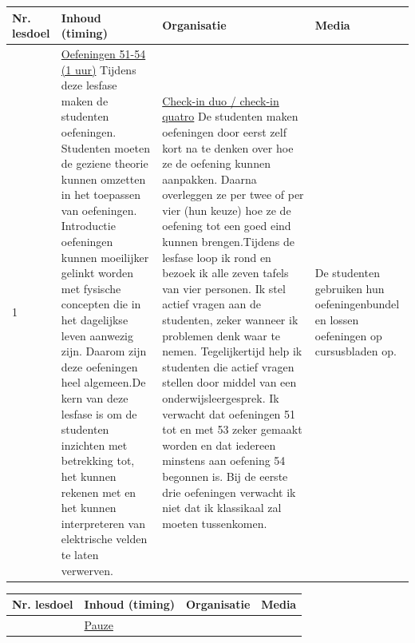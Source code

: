 \begin{landscape}
\begin{tabularx}{1.56\textwidth}{|p{1.5cm}|p{6cm}|X|p{4cm}|}
	\hline
	\textbf{Nr. lesdoel } & \textbf{Inhoud (timing)}  & \textbf{Organisatie } & \textbf{Media } \\ \hline
	1\newline 2\newline 3\newline 4\newline 5\newline 6\newline 9	&\underline{Oefeningen 51-54 (1 uur)}\newline
	Tijdens deze lesfase maken de studenten oefeningen. Studenten moeten de geziene theorie kunnen omzetten in het toepassen van oefeningen. Introductie oefeningen kunnen moeilijker gelinkt worden met fysische concepten die in het dagelijkse leven aanwezig zijn.  Daarom zijn deze oefeningen heel algemeen.\newline De kern van deze lesfase is om de studenten  inzichten met betrekking tot, het kunnen rekenen met en het kunnen interpreteren van  elektrische velden te laten verwerven.

	&  \underline{Check-in duo / check-in quatro}\newline 
	De studenten maken oefeningen door eerst zelf kort na te denken over hoe ze de oefening kunnen aanpakken. Daarna overleggen ze per twee of per vier (hun keuze) hoe ze de oefening tot een goed eind kunnen brengen.\newline	Tijdens de lesfase loop ik rond en bezoek ik alle zeven tafels van vier personen. Ik stel actief vragen aan de studenten, zeker wanneer ik problemen denk waar te nemen. Tegelijkertijd help ik studenten die actief vragen stellen door middel van een onderwijsleergesprek. \newline
	Ik verwacht dat oefeningen 51 tot en met 53 zeker gemaakt worden en dat iedereen minstens aan oefening 54 begonnen is. Bij de eerste drie oefeningen verwacht ik niet dat ik klassikaal zal moeten tussenkomen.  
	& De studenten gebruiken hun oefeningenbundel en lossen oefeningen op cursusbladen op.
	\\ \hline
\end{tabularx}





\begin{tabularx}{1.56\textwidth}{|p{1.5cm}|p{6cm}|X|p{4cm}|}
	\hline
	\textbf{Nr. lesdoel } & \textbf{Inhoud (timing)}  & \textbf{Organisatie } & \textbf{Media } \\ \hline
		&\underline{Pauze}\newline
	

\end{tabularx}
\end{landscape}
